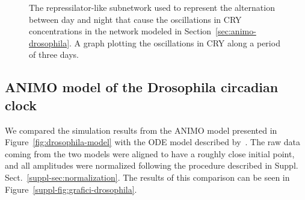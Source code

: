 \documentclass{bmcart}
\begin{document}
\begin{figure}[!htb]
\begin{minipage}{\textwidth}
  \centering
  \qquad
\caption{{\bf \protect{}} The repressilator-like subnetwork used to represent the alternation
between day and night that cause the oscillations in {\sf CRY} concentrations in the
network modeled in Section~\ref{sec:animo-drosophila}.
{\bf \protect{}} A graph plotting the oscillations in {\sf CRY} along
a period of three days.}\label{fig:repressilator}
\end{minipage}
\end{figure}


\subsection*{ANIMO model of the Drosophila circadian clock}\label{suppl-sec:animo-drosophila}
We compared the simulation results from the ANIMO model presented in Figure~\ref{fig:drosophila-model}
with the ODE model described by~\cite{drosophila-ode-model}. The raw data coming from the
two models were aligned to have a roughly close initial point, and all amplitudes were normalized
following the procedure described in Suppl. Sect.~\ref{suppl-sec:normalization}. The results
of this comparison can be seen in Figure~\ref{suppl-fig:grafici-drosophila}.
\end{document}
